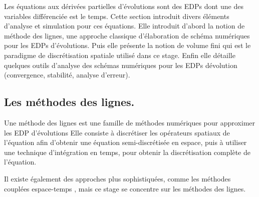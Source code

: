     Les équations aux dérivées partielles d'évolutions sont des EDPs dont une des variables différenciée est le temps.
    Cette section introduit divers éléments d'analyse et simulation pour ces équations.
    Elle introduit d'abord la notion de méthode des lignes, une approche classique d'élaboration de schéma numériques pour les EDPs d'évolutions.
    Puis elle présente la notion de volume fini qui est le paradigme de discrétisation spatiale utilisé dans ce stage.
    Enfin elle détaille quelques outils d'analyse des schémas numériques pour les EDPs dévolution (convergence, stabilité, analyse d'erreur).
    \subsection{Les méthodes des lignes.}
    \begin{definition}
        Une méthode des lignes est une famille de méthodes numériques pour approximer les EDP d'évolutions
        Elle consiste à discrétiser les opérateurs spatiaux de l'équation afin d'obtenir une équation semi-discrétisée en espace,
        puis à utiliser une technique d'intégration en temps, pour obtenir la discrétisation complète de l'équation.
    \end{definition}

    Il existe également des approches plus sophistiquées, comme les méthodes couplées espace-temps \cite{DARU2004563}, mais ce stage se concentre sur les méthodes des lignes.
